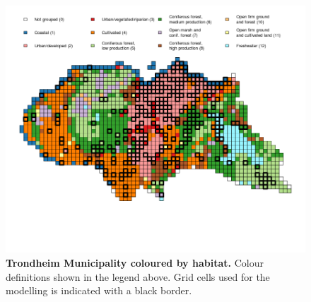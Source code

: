 \documentclass{article}
\begin{document}
\FloatBarrier  %

\begin{figure}[h]   
\includegraphics [width=1\textwidth]{Cluster_map_border.png}
\caption {\textbf{Trondheim Municipality coloured by habitat.} Colour definitions shown in the legend above. Grid cells used for the modelling is indicated with a black border.}
\label{fig:Clusters}\end {figure}
\end{document}
